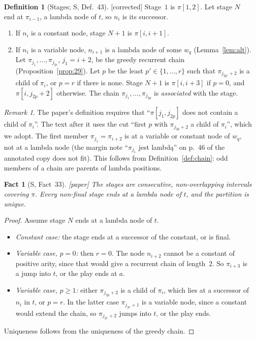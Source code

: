 \documentclass[11pt]{article}
\newcommand{\iv}[2]{\pi[#1,#2]}
\newcommand{\Paper}{\textsf{[paper]}}
\newcommand{\Fixed}{\textsf{[corrected]}}
\theoremstyle{plain}
\newtheorem{fact}[theorem]{Fact}
\theoremstyle{definition}
\newtheorem{definition}[theorem]{Definition}
\theoremstyle{remark}
\newtheorem{remark}[theorem]{Remark}
\begin{document}
\begin{definition}[Stages; S, Def.~43]\label{def:stages}
\Fixed{} Stage~$1$ is $\iv12$.  Let stage $N$ end at $\pi_{i-1}$, a
lambda node of $t$, so $n_i$ is its successor.
\begin{enumerate}
\item If $n_i$ is a constant node, stage $N+1$ is $\iv i{i+1}$.
\item If $n_i$ is a variable node, $n_{i+1}$ is a lambda node of some
  $w_q$ (Lemma~\ref{lem:alt}).  Let $\pi_{j_1},\dots,\pi_{j_{2r}}$,
  $j_1=i+2$, be the greedy recurrent chain
  (Proposition~\ref{prop:29}).  Let $p$ be the least $p'\in\{1,\dots,r\}$
  such that $\pi_{j_{2p'}+2}$ is a child of $\pi_i$, or $p=r$ if there is
  none.  Stage $N+1$ is $\iv i{i+3}$ if $p=0$, and $\iv i{j_{2p}+2}$
  otherwise.  The chain $\pi_{j_1},\dots,\pi_{j_{2p}}$ is
  \emph{associated} with the stage.
\end{enumerate}
\end{definition}

\begin{remark}
The paper's definition requires that ``$\iv{j_1}{j_{2p}}$ does not
contain a child of $\pi_i$''.  The text after it uses the cut ``first
$p$ with $\pi_{j_{2p}+2}$ a child of $\pi_i$'', which we adopt.  The
first member $\pi_{j_1}=\pi_{i+2}$ is at a variable or constant node of
$w_q$, not at a lambda node (the margin note ``$\pi_{j_1}$ jest
lambd\k{a}'' on p.~46 of the annotated copy does not fit).  This follows
from Definition~\ref{def:chain}: odd members of a chain are parents of
lambda positions.
\end{remark}

\begin{fact}[S, Fact~33]\label{fact:33}
\Paper{} The stages are consecutive, non-overlapping intervals covering
$\pi$.  Every non-final stage ends at a lambda node of $t$, and the
partition is unique.
\end{fact}
\begin{proof}
Assume stage $N$ ends at a lambda node of $t$.
\begin{itemize}
\item \emph{Constant case:} the stage ends at a successor of the
  constant, or is final.
\item \emph{Variable case, $p=0$:} then $r=0$.  The node $n_{i+2}$ cannot
  be a constant of positive arity, since that would give a recurrent
  chain of length~$2$.  So $\pi_{i+3}$ is a jump into $t$, or the play
  ends at $a$.
\item \emph{Variable case, $p\ge1$:} either $\pi_{j_{2p}+2}$ is a child of
  $\pi_i$, which lies at a successor of $n_i$ in $t$, or $p=r$.  In the
  latter case $\pi_{j_{2r}+1}$ is a variable node, since a constant would
  extend the chain, so $\pi_{j_{2r}+2}$ jumps into $t$, or the play ends.
\end{itemize}
Uniqueness follows from the uniqueness of the greedy chain.
\end{proof}
\end{document}
